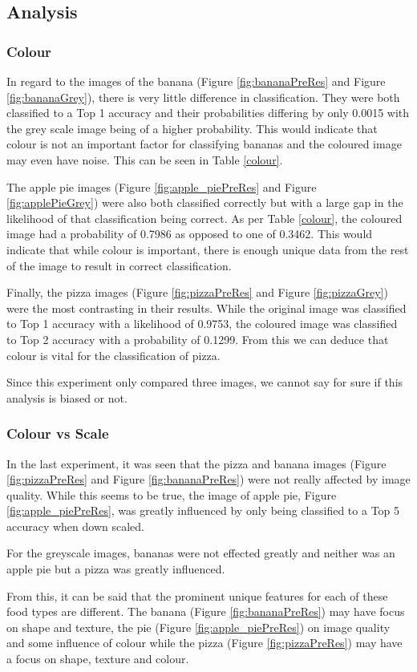 \tocless\subsection{Analysis}
\tocless\subsubsection{Colour}
In regard to the images of the banana (Figure \ref{fig:bananaPreRes} and Figure \ref{fig:bananaGrey}), there is very little difference in classification. They were both classified to a Top 1 accuracy and their probabilities differing by only 0.0015 with the grey scale image being of a higher probability. This would indicate that colour is not an important factor for classifying bananas and the coloured image may even have noise. This can be seen in Table \ref{colour}.

The apple pie images (Figure \ref{fig:apple_piePreRes} and Figure \ref{fig:applePieGrey}) were also both classified correctly but with a large gap in the likelihood of that classification being correct. As per Table \ref{colour}, the coloured image had a probability of 0.7986 as opposed to one of 0.3462. This would indicate that while colour is important, there is enough unique data from the rest of the image to result in correct classification.

Finally, the pizza images (Figure \ref{fig:pizzaPreRes} and Figure \ref{fig:pizzaGrey}) were the most contrasting in their results. While the original image was classified to Top 1 accuracy with a likelihood of 0.9753, the coloured image was classified to Top 2 accuracy with a probability of 0.1299. From this we can deduce that colour is vital for the classification of pizza.

Since this experiment only compared three images, we cannot say for sure if this analysis is biased or not.

\tocless\subsubsection{Colour vs Scale}
In the last experiment, it was seen that the pizza and banana images (Figure \ref{fig:pizzaPreRes} and Figure \ref{fig:bananaPreRes}) were not really affected by image quality. While this seems to be true, the image of apple pie, Figure \ref{fig:apple_piePreRes}, was greatly influenced by only being classified to a Top 5 accuracy when down scaled.

For the greyscale images, bananas were not effected greatly and neither was an apple pie but a pizza was greatly influenced.

From this, it can be said that the prominent unique features for each of these food types are different. The banana (Figure \ref{fig:bananaPreRes}) may have focus on shape and texture, the pie (Figure \ref{fig:apple_piePreRes}) on image quality and some influence of colour while the pizza (Figure \ref{fig:pizzaPreRes}) may have a focus on shape, texture and colour.

